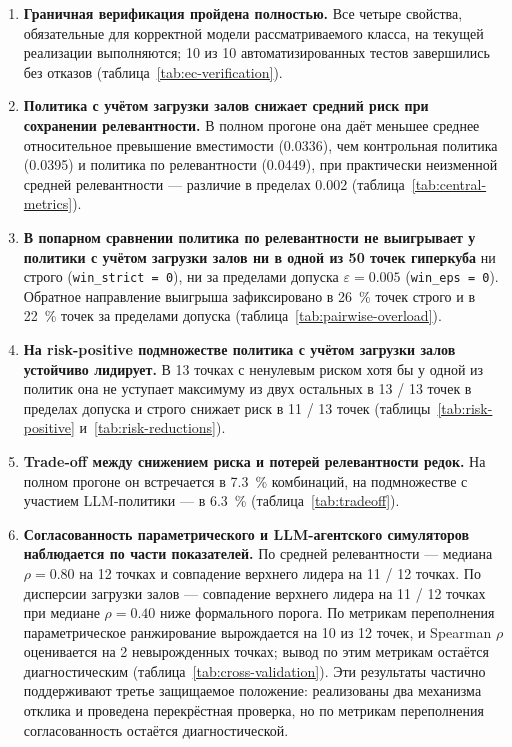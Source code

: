 \begin{enumerate}
\item \textbf{Граничная верификация пройдена полностью.} Все четыре свойства, обязательные для корректной модели рассматриваемого класса, на текущей реализации выполняются; 10 из 10 автоматизированных тестов завершились без отказов (таблица~\ref{tab:ec-verification}).

\item \textbf{Политика с учётом загрузки залов снижает средний риск при сохранении релевантности.} В полном прогоне она даёт меньшее среднее относительное превышение вместимости (0.0336), чем контрольная политика (0.0395) и политика по релевантности (0.0449), при практически неизменной средней релевантности --- различие в пределах 0.002 (таблица~\ref{tab:central-metrics}).

\item \textbf{В попарном сравнении политика по релевантности не выигрывает у политики с учётом загрузки залов ни в одной из 50 точек гиперкуба} ни строго (\texttt{win\_strict = 0}), ни за пределами допуска $\varepsilon = 0.005$ (\texttt{win\_eps = 0}). Обратное направление выигрыша зафиксировано в 26~\% точек строго и в 22~\% точек за пределами допуска (таблица~\ref{tab:pairwise-overload}).

\item \textbf{На risk-positive подмножестве политика с учётом загрузки залов устойчиво лидирует.} В 13 точках с ненулевым риском хотя бы у одной из политик она не уступает максимуму из двух остальных в 13 / 13 точек в пределах допуска и строго снижает риск в 11 / 13 точек (таблицы~\ref{tab:risk-positive} и~\ref{tab:risk-reductions}).

\item \textbf{Trade-off между снижением риска и потерей релевантности редок.} На полном прогоне он встречается в 7.3~\% комбинаций, на подмножестве с участием LLM-политики --- в 6.3~\% (таблица~\ref{tab:tradeoff}).

\item \textbf{Согласованность параметрического и LLM-агентского симуляторов наблюдается по части показателей.} По средней релевантности --- медиана $\rho = 0.80$ на 12 точках и совпадение верхнего лидера на 11 / 12 точках. По дисперсии загрузки залов --- совпадение верхнего лидера на 11 / 12 точках при медиане $\rho = 0.40$ ниже формального порога. По метрикам переполнения параметрическое ранжирование вырождается на 10 из 12 точек, и Spearman $\rho$ оценивается на 2 невырожденных точках; вывод по этим метрикам остаётся диагностическим (таблица~\ref{tab:cross-validation}). Эти результаты частично поддерживают третье защищаемое положение: реализованы два механизма отклика и проведена перекрёстная проверка, но по метрикам переполнения согласованность остаётся диагностической.


\end{enumerate}

